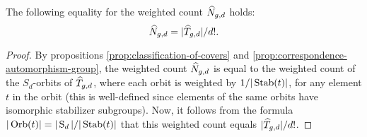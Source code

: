 \begin{lemma}
 The following equality for the weighted count $\widehat{N}_{g,d}$ holds: \[\widehat{N}_{g,d}=|\widehat{T}_{g,d}|/d!.\]
\end{lemma}

\begin{proof}
 By propositions \ref{prop:classification-of-covers} and \ref{prop:correspondence-automorphism-group}, the weighted count $\widehat{N}_{g,d}$ is equal to the weighted count of the $S_d$-orbits of $\widehat{T}_{g,d}$, where each orbit is weighted by $1/|\operatorname{Stab}(t)|$, for any element $t$ in the orbit (this is well-defined since elements of the same orbits have isomorphic stabilizer subgroups). Now, it follows from the formula $|\operatorname{Orb}(t)|=|\operatorname{S}_d|/|\operatorname{Stab}(t)|$ that this weighted count equals $|\widehat{T}_{g,d}|/d!$.
\end{proof}
